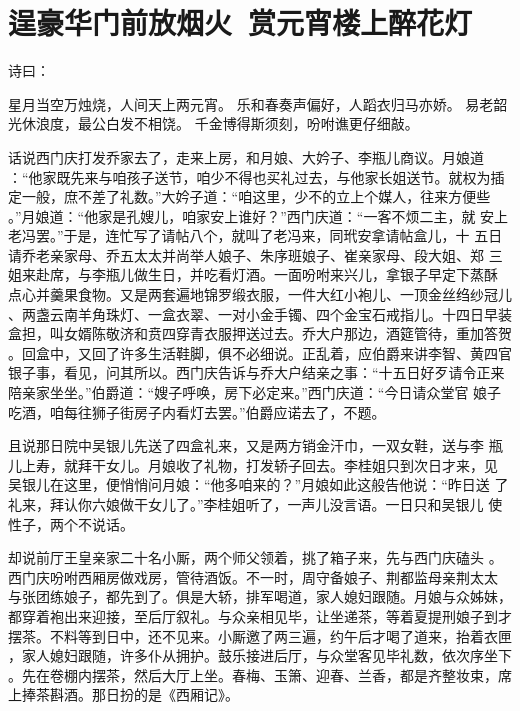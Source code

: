 \chapter{逞豪华门前放烟火~赏元宵楼上醉花灯}

诗曰：

星月当空万烛烧，人间天上两元宵。
乐和春奏声偏好，人蹈衣归马亦娇。
易老韶光休浪度，最公白发不相饶。
千金博得斯须刻，吩咐谯更仔细敲。

话说西门庆打发乔家去了，走来上房，和月娘、大妗子、李瓶儿商议。月娘道
：“他家既先来与咱孩子送节，咱少不得也买礼过去，与他家长姐送节。就权为插
定一般，庶不差了礼数。”大妗子道：“咱这里，少不的立上个媒人，往来方便些
。”月娘道：“他家是孔嫂儿，咱家安上谁好？”西门庆道：“一客不烦二主，就
安上老冯罢。”于是，连忙写了请帖八个，就叫了老冯来，同玳安拿请帖盒儿，十
五日请乔老亲家母、乔五太太并尚举人娘子、朱序班娘子、崔亲家母、段大姐、郑
三姐来赴席，与李瓶儿做生日，并吃看灯酒。一面吩咐来兴儿，拿银子早定下蒸酥
点心并羹果食物。又是两套遍地锦罗缎衣服，一件大红小袍儿、一顶金丝绉纱冠儿
、两盏云南羊角珠灯、一盒衣翠、一对小金手镯、四个金宝石戒指儿。十四日早装
盒担，叫女婿陈敬济和贲四穿青衣服押送过去。乔大户那边，酒筵管待，重加答贺
。回盒中，又回了许多生活鞋脚，俱不必细说。正乱着，应伯爵来讲李智、黄四官
银子事，看见，问其所以。西门庆告诉与乔大户结亲之事：“十五日好歹请令正来
陪亲家坐坐。”伯爵道：“嫂子呼唤，房下必定来。”西门庆道：“今日请众堂官
娘子吃酒，咱每往狮子街房子内看灯去罢。”伯爵应诺去了，不题。

且说那日院中吴银儿先送了四盒礼来，又是两方销金汗巾，一双女鞋，送与李
瓶儿上寿，就拜干女儿。月娘收了礼物，打发轿子回去。李桂姐只到次日才来，见
吴银儿在这里，便悄悄问月娘：“他多咱来的？”月娘如此这般告他说：“昨日送
了礼来，拜认你六娘做干女儿了。”李桂姐听了，一声儿没言语。一日只和吴银儿
使性子，两个不说话。

却说前厅王皇亲家二十名小厮，两个师父领着，挑了箱子来，先与西门庆磕头
。西门庆吩咐西厢房做戏房，管待酒饭。不一时，周守备娘子、荆都监母亲荆太太
与张团练娘子，都先到了。俱是大轿，排军喝道，家人媳妇跟随。月娘与众姊妹，
都穿着袍出来迎接，至后厅叙礼。与众亲相见毕，让坐递茶，等着夏提刑娘子到才
摆茶。不料等到日中，还不见来。小厮邀了两三遍，约午后才喝了道来，抬着衣匣
，家人媳妇跟随，许多仆从拥护。鼓乐接进后厅，与众堂客见毕礼数，依次序坐下
。先在卷棚内摆茶，然后大厅上坐。春梅、玉箫、迎春、兰香，都是齐整妆束，席
上捧茶斟酒。那日扮的是《西厢记》。

